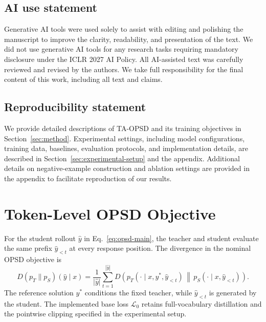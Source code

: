 \documentclass{article} %
\begin{document}
\subsection*{AI use statement}

Generative AI tools were used solely to assist with editing and polishing the manuscript to improve the clarity, readability, and presentation of the text. We did not use generative AI tools for any research tasks requiring mandatory disclosure under the ICLR 2027 AI Policy. All AI-assisted text was carefully reviewed and revised by the authors. We take full responsibility for the final content of this work, including all text and claims.


\subsection*{Reproducibility statement}

We provide detailed descriptions of TA-OPSD and its training objectives in Section~\ref{sec:method}. Experimental settings, including model configurations, training data, baselines, evaluation protocols, and implementation details, are described in Section~\ref{sec:experimental-setup} and the appendix. Additional details on negative-example construction and ablation settings are provided in the appendix to facilitate reproduction of our results.




\appendix
{}

\section{Token-Level OPSD Objective}
\label{app:opsd-token}

For the student rollout $\hat y$ in Eq.~\ref{eq:opsd-main}, the teacher and student evaluate the same prefix $\hat y_{<t}$ at every response position. The divergence in the nominal OPSD objective is
\begin{equation}
D(p_T\|p_S)(\hat y\mid x)=\frac{1}{|\hat y|}\sum_{t=1}^{|\hat y|}D\!\left(p_T(\cdot\mid x,y^*,\hat y_{<t})\,\middle\|\,p_S(\cdot\mid x,\hat y_{<t})\right).
\label{eq:opsd-token-detail}
\end{equation}
The reference solution $y^*$ conditions the fixed teacher, while $\hat y_{<t}$ is generated by the student. The implemented base loss $\mathcal L_0$ retains full-vocabulary distillation and the pointwise clipping specified in the experimental setup.
\end{document}
